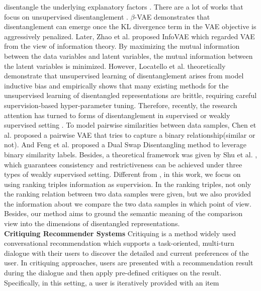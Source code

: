 disentangle the underlying explanatory factors \cite{Bengio13Disentangle}. There are a lot of works that focus on unsupervised disentanglement \cite{Higgins17betaVAE, kumar18DIPVAE, Zhao17InfoVAE, chen18betaTCVAE, KimM18FactorVAE, mazhou0Y019MacridVAE}. $\beta$-VAE \cite{Higgins17betaVAE} demonstrates that disentanglement can emerge once the KL divergence term in the VAE \cite{KingmaW13VAE} objective is aggressively penalized. Later, Zhao et al. \cite{Zhao17InfoVAE} proposed InfoVAE which regarded VAE from the view of information theory. By maximizing the mutual information between the data variables and latent variables, the mutual information between the latent variables is minimized. However, Locatello et al. \cite{Locatello18ChallengeDisentangle} theoretically demonstrate that unsupervised learning of disentanglement arises from model inductive bias and empirically shows that many existing methods for the unsupervised learning of disentangled representations are brittle, requiring careful supervision-based hyper-parameter tuning. Therefore, recently, the research attention has turned to forms of disentanglement in supervised or weakly supervised setting \cite{Feng18DualSwap, Chen17MVGAN, ChenB20PairwiseVAE, Gabbay19LatentOptimDisentangle}. To model pairwise similarities between data samples, Chen et al.\cite{ChenB20PairwiseVAE} proposed a pairwise VAE that tries to capture a binary relationship(similar or not). And Feng et al.\cite{Feng18DualSwap} proposed a Dual Swap Disentangling method to leverage binary similarity labels. Besides, a theoretical framework was given by Shu et al. \cite{shu20disentangleguarantee}, which guarantees consistency and restrictiveness can be achieved under three types of weakly supervised setting. Different from \cite{Feng18DualSwap, ChenB20PairwiseVAE}, in this work, we focus on using ranking triples information as supervision. In the ranking triples, not only the ranking relation between two data samples were given, but we also provided the information about we compare the two data samples in which point of view. Besides, our method aims to ground the semantic meaning of the comparison view into the dimensions of disentangled representations.
\\
\textbf{Critiquing Recommender Systems}
Critiquing is a method widely used conversational recommendation\cite{thompson2004personalized} which supports a task-oriented, multi-turn dialogue with their users to discover the detailed and current preferences of the user\cite{jannach2020survey}. In critiquing approaches, users are presented with a recommendation result during the dialogue and then apply pre-defined critiques on the result\cite{burke1997findme, hammond1995faq}. Specifically, in this setting, a user is iteratively provided with an item
